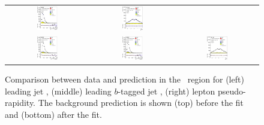 \begin{figure}[tp]
\begin{tabular}{ccc}
  \includegraphics[width=0.27\textwidth]{Analysis/Figures_ttH/tesis_vars/prefit/bjet1_pt_4jetex2btagex.eps} &
  \includegraphics[width=0.27\textwidth]{Analysis/Figures_ttH/tesis_vars/prefit/lep_eta_4jetex2btagex.eps} \\
  \includegraphics[width=0.27\textwidth]{Analysis/Figures_ttH/tesis_vars/postfit/jet1_pt_4jetex2btagex.eps} &
  \includegraphics[width=0.27\textwidth]{Analysis/Figures_ttH/tesis_vars/postfit/bjet1_pt_4jetex2btagex.eps} &
  \includegraphics[width=0.27\textwidth]{Analysis/Figures_ttH/tesis_vars/postfit/lep_eta_4jetex2btagex.eps} \\
\end{tabular}
\caption{Comparison between data and prediction in the \fourtwo\ region for (left) leading jet \pt, (middle) leading $b$-tagged jet \pt, (right) lepton pseudo-rapidity. The background prediction is shown (top) before the fit and (bottom) after the fit.}
  \label{fig:vars2_fourtwo}
\end{figure}

